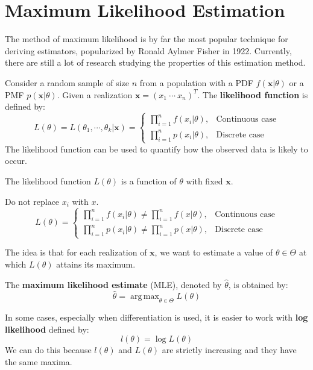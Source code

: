 \documentclass{huhtakm-template-book-v2}
\DeclareMathOperator*{\argmax}{arg\,max}
\begin{document}
\newpage
\section{Maximum Likelihood Estimation}
The method of maximum likelihood is by far the most popular technique for deriving estimators, popularized by Ronald Aylmer Fisher in 1922. Currently, there are still a lot of research studying the properties of this estimation method.
\begin{defn}
	Consider a random sample of size $n$ from a population with a PDF $f(\mathbf{x}|\theta)$ or a PMF $p(\mathbf{x}|\theta)$. Given a realization $\mathbf{x}=(x_{1}\ \cdots\ x_{n})^{T}$. The \textbf{likelihood function} is defined by:
	\begin{equation*}
		L(\theta)=L(\theta_{1},\cdots,\theta_{k}|\mathbf{x})=\begin{cases}
			\prod_{i=1}^{n}f(x_{i}|\theta), &\text{Continuous case}\\
			\prod_{i=1}^{n}p(x_{i}|\theta), &\text{Discrete case}
		\end{cases}
	\end{equation*}
	The likelihood function can be used to quantify how the observed data is likely to occur.
\end{defn}
\begin{rem}
	The likelihood function $L(\theta)$ is a function of $\theta$ with fixed $\mathbf{x}$.
\end{rem}
\begin{rem}
	Do not replace $x_{i}$ with $x$.
	\begin{equation*}
		L(\theta)=\begin{cases}
			\prod_{i=1}^{n}f(x_{i}|\theta)\neq\prod_{i=1}^{n}f(x|\theta), &\text{Continuous case}\\
			\prod_{i=1}^{n}p(x_{i}|\theta)\neq\prod_{i=1}^{n}p(x|\theta), &\text{Discrete case}
		\end{cases}
	\end{equation*}
\end{rem}
The idea is that for each realization of $\mathbf{x}$, we want to estimate a value of $\theta\in\Theta$ at which $L(\theta)$ attains its maximum.
\begin{defn}
	The \textbf{maximum likelihood estimate} (MLE), denoted by $\hat{\theta}$, is obtained by:
	\begin{equation*}
		\hat{\theta}=\argmax_{\theta\in\Theta}L(\theta)
	\end{equation*}
\end{defn}
\begin{rem}
	In some cases, especially when differentiation is used, it is easier to work with \textbf{log likelihood} defined by:
	\begin{equation*}
		l(\theta)=\log{L(\theta)}
	\end{equation*}
	We can do this because $l(\theta)$ and $L(\theta)$ are strictly increasing and they have the same maxima. 
\end{rem}
\end{document}
